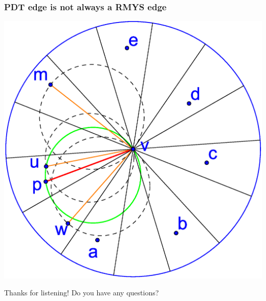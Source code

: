 \documentclass[compress]{beamer}
\begin{document}
\begin{frame}
	\frametitle{PDT edge is not always a RMYS edge}
	\center \includegraphics[width=0.7\linewidth]{RMYS_case_one_cone_empty.eps}
\end{frame}


\begin{frame}
\center \Large Thanks for listening!
\center Do you have any questions?
\end{frame}
\end{document}
